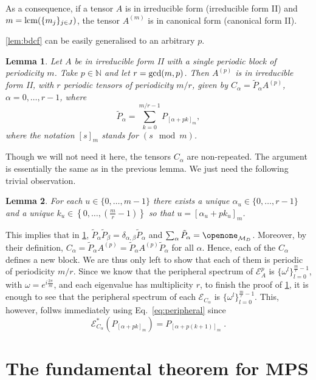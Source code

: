 \documentclass[pra,a4paper,notitlepage,nofootinbib,superscriptaddress]{revtex4-1}
\theoremstyle{plain}
\newtheorem{lemma}{Lemma}
\newcommand{\E}{\mathcal{E}}
\newcommand{\1}{{\openone}}
\begin{document}
As a consequence, if a tensor $A$ is in irreducible form (irreducible form
II) and $m={\rm lcm}(\{m_j\}_{j\in J})$, the tensor $A^{(m)}$ is in
canonical form (canonical form II).


\cref{lem:bdcf} can be easily generalised to an arbitrary $p$.

\begin{lemma}
    \label{lem:blocking-arbitrary}
    Let $A$ be in irreducible form II with a single periodic block of periodicity $m$.
    Take $p\in \mathbb{N}$ and let $r={\rm gcd}(m,p)$. Then $A^{(p)}$ is in irreducible form II, with $r$ periodic tensors of periodicity $m/r$, given by
    $C_\alpha= \tilde{P}_\alpha A^{(p)}$, $\alpha=0,\ldots, r-1$, where
    $$
        \tilde{P}_\alpha=\sum_{k=0}^{m/r-1} P_{[\alpha + pk]_m},
    $$
    where the notation $[s]_m$ stands for $(s\mod m)$.
\end{lemma}

Though we will not need it here, the tensors $C_\alpha$ are non-repeated. The argument is essentially the same as in the previous lemma. We just need the following trivial observation.

\begin{lemma}\label{lem:unique-dec}
    For each $u\in\{0,\ldots, m-1\}$ there exists a unique $\alpha_u\in\{0,\ldots, r-1\}$ and a unique $k_u\in\left\{0,\ldots, \left(\frac{m}{r}-1\right)\right\}$ so that
    $u=[\alpha_u+ pk_u]_m$.
\end{lemma}

This implies that in \cref{lem:blocking-arbitrary}, $\tilde{P}_\alpha \tilde{P}_{\beta}=\delta_{\alpha,\beta}\tilde{P}_\alpha$ and $\sum_\alpha \tilde{P}_\alpha=\1_{\mathcal{M}_D}$. Moreover, by their definition, $C_\alpha=\tilde{P}_\alpha A^{(p)}=\tilde{P}_\alpha A^{(p)}\tilde{P}_\alpha$ for all $\alpha$. Hence, each of the $C_\alpha$ defines a new block. We are thus only left to show that each of them is periodic of periodicity $m/r$. Since we know that the peripheral spectrum of $\E_{A}^p$ is $\{\omega^l\}_{l=0}^{\frac{m}{r}-1}$, with $\omega=e^{i\frac{2\pi}{m}}$, and each eigenvalue has multiplicity $r$, to finish the proof of \cref{lem:blocking-arbitrary}, it is enough to see that the peripheral spectrum of each $\E_{C_\alpha}$ is $\{\omega^l\}_{l=0}^{\frac{m}{r}-1}$.
This, however, follws immediately using Eq.\ \eqref{eq:peripheral} since
$$
    \E^*_{C_\alpha}(P_{[\alpha + pk]_m})=P_{[\alpha + p(k+1)]_m}\; .
$$


\section{The fundamental theorem for MPS}
\label{sec:thm}
\end{document}

